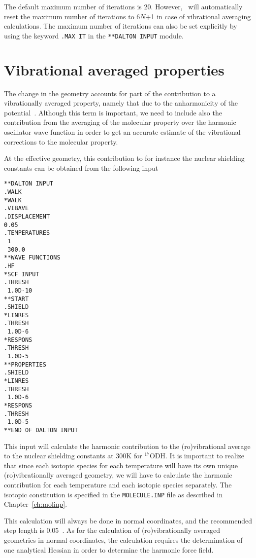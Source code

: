 The default maximum number of iterations is 20. However, \dalton\ will
automatically reset the maximum number of iterations to 6$N$+1 in case
of vibrational averaging calculations. The maximum number of
iterations can also be set explicitly by using
the keyword \verb|.MAX IT| in the \verb|**DALTON INPUT| module.

\section{Vibrational averaged
properties}\label{sec:vibavegeo}

The change in the geometry accounts for part of the contribution to a
vibrationally averaged property, namely that due to the anharmonicity
of the potential~\cite{krpoaprtjacs123}. Although this term is important, we need to
include also the contribution from the averaging of the molecular
property over the harmonic oscillator wave function in order to get an
accurate estimate of the vibrational corrections to the molecular
property. 

At the effective geometry, this contribution to for instance the
nuclear shielding constants can be obtained from the following input
\begin{verbatim}
**DALTON INPUT
.WALK
*WALK
.VIBAVE
.DISPLACEMENT
0.05
.TEMPERATURES
 1
 300.0
**WAVE FUNCTIONS
.HF
*SCF INPUT
.THRESH
 1.0D-10
**START
.SHIELD
*LINRES
.THRESH
 1.0D-6
*RESPONS
.THRESH
 1.0D-5
**PROPERTIES
.SHIELD
*LINRES
.THRESH
 1.0D-6
*RESPONS
.THRESH
 1.0D-5
**END OF DALTON INPUT
\end{verbatim}

This input will calculate the harmonic contribution to the
(ro)vibrational average to the nuclear shielding constants at 300K for
$^{17}$ODH. It is important to realize that since each isotopic
species for each temperature will have its own unique
(ro)vibrationally averaged geometry, we will have to calculate the
harmonic contribution for each temperature and each isotopic species
separately. The isotopic constitution is specified in the
\verb|MOLECULE.INP| file as described in Chapter~\ref{ch:molinp}.

This calculation will always be done in normal coordinates, and the
recommended step length is 0.05~\cite{krpoaprtjcp112}. As for the calculation of
(ro)vibrationally averaged geometries in normal coordinates, the
calculation requires the determination of one analytical Hessian in
order to determine the harmonic force field.



